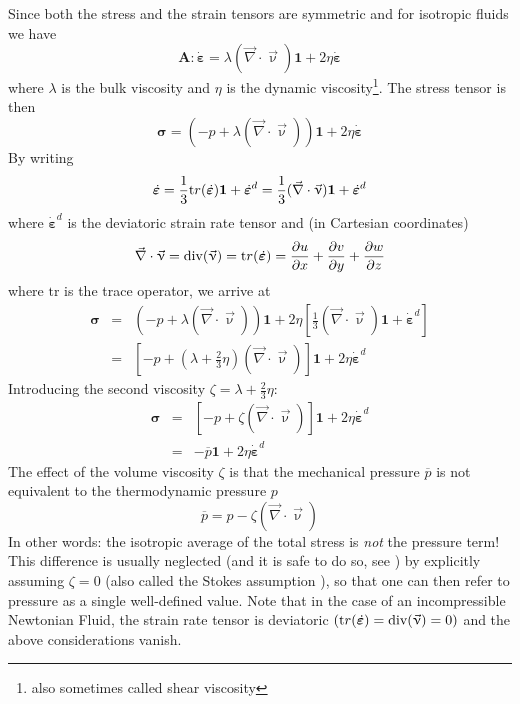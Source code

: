 Since both the stress and the strain tensors are symmetric and for isotropic 
fluids we have \cite{malvern}
\begin{equation}
{\bm A}:\dot{\bm \varepsilon} = \lambda (\vec\nabla\cdot\vec\upnu) {\bm 1} + 2\eta \dot{\bm \varepsilon}
\end{equation}
where $\lambda$ is the bulk viscosity and $\eta$ is the dynamic viscosity\footnote{also sometimes called shear viscosity}. 
The stress tensor is then 
\begin{equation}
{\bm \sigma} = (-p  + \lambda (\vec\nabla\cdot\vec\upnu)) {\bm 1} + 2\eta \dot{\bm \varepsilon}
\end{equation}
By writing 
\[
\dot{\bm \varepsilon} = \frac{1}{3}{\text tr}(\dot{\bm \varepsilon}) {\bm 1} + \dot{\bm \varepsilon}^d =
 \frac{1}{3}(\vec\nabla\cdot\vec\upnu) {\bm 1} + \dot{\bm \varepsilon}^d
\]
where $\dot{\bm \varepsilon}^d$ is the deviatoric strain rate tensor and 
(in Cartesian coordinates)
\begin{equation}
\vec\nabla\cdot\vec\upnu = 
\text{div} (\vec\upnu ) =
{\text tr}(\dot{\bm \varepsilon}) =
\frac{\partial u}{\partial x}+ 
\frac{\partial v}{\partial y}+ 
\frac{\partial w}{\partial z} 
\end{equation} 
where $\text{tr}$ is the trace operator, we arrive at
\begin{eqnarray}
{\bm \sigma} 
&=& (-p+\lambda(\vec\nabla\cdot\vec\upnu)) {\bm 1} + 2\eta \left[ \frac{1}{3}(\vec\nabla\cdot\vec\upnu) {\bm 1} + \dot{\bm \varepsilon}^d \right] \\
&=& \left[ -p+\left(\lambda+\frac{2}{3}\eta\right)(\vec\nabla\cdot\vec\upnu)\right] {\bm 1} + 2\eta  \dot{\bm \varepsilon}^d  
\end{eqnarray}
Introducing the second viscosity $\zeta=\lambda+\frac{2}{3}\eta$:
\begin{eqnarray}
{\bm \sigma} 
&=& \left[ -p+ \zeta (\vec\nabla\cdot\vec\upnu)\right] {\bm 1} + 2\eta  \dot{\bm \varepsilon}^d \\ 
&=&  -\overline{p} {\bm 1} + 2\eta  \dot{\bm \varepsilon}^d  
\end{eqnarray}
The effect of the volume viscosity $\zeta$ is that the mechanical pressure $\overline{p}$
is not equivalent to the thermodynamic pressure $p$ 
\begin{equation}
\overline{p}=p - \zeta (\vec\nabla\cdot\vec\upnu)
\end{equation}
In other words: the isotropic average of the total stress is {\sl not} the pressure term!
This difference is usually neglected (and it is safe to do so, see \cite[section 7.02.3.2.2]{berc09}) 
by explicitly assuming $\zeta=0$ (also called the Stokes assumption \cite[p256]{scto01}), 
so that one can then refer to pressure as a single well-defined value.
Note that in the case of an incompressible Newtonian Fluid, 
the strain rate tensor is deviatoric $({\text tr}(\dot{\bm \varepsilon}) = \text{div}(\vec\upnu) =0)$ and the above considerations vanish.

